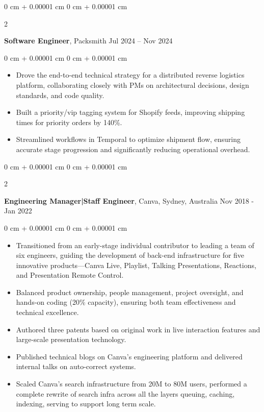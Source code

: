 \documentclass[10pt, letterpaper]{article}
\newenvironment{highlights}{
    \begin{itemize}[
        topsep=0.10 cm,
        parsep=0.10 cm,
        partopsep=0pt,
        itemsep=0pt,
        leftmargin=0 cm + 10pt
    ]
}{
    \end{itemize}
} %
\newenvironment{onecolentry}{
    \begin{adjustwidth}{
        0 cm + 0.00001 cm
    }{
        0 cm + 0.00001 cm
    }
}{
    \end{adjustwidth}
} %
\newenvironment{twocolentry}[2][]{
    \onecolentry
    \def\secondColumn{#2}
    \setcolumnwidth{\fill, 4.5 cm}
    \begin{paracol}{2}
}{
    \switchcolumn \raggedleft \secondColumn
    \end{paracol}
    \endonecolentry
} %
\begin{document}
        \vspace{0.15 cm}
        \begin{twocolentry}{
            Jul 2024 – Nov 2024
        }
            \textbf{Software Engineer}, Packsmith\end{twocolentry}

        \vspace{0.10 cm}
        \begin{onecolentry}
            \begin{highlights}
                \item Drove the end-to-end technical strategy for a distributed reverse logistics platform, collaborating closely with PMs on architectural decisions, design standards, and code quality.
                \item Built a priority/vip tagging system for Shopify feeds, improving shipping times for priority orders by 140\%.
                \item Streamlined workflows in Temporal to optimize shipment flow, ensuring accurate stage progression and significantly reducing operational overhead.
            \end{highlights}
        \end{onecolentry}
        
        \vspace{0.15 cm}

        \begin{twocolentry}{
            Nov 2018 - Jan 2022
        }
            \textbf{Engineering Manager|Staff Engineer}, Canva, Sydney, Australia\end{twocolentry}

        \vspace{0.10 cm}
        \begin{onecolentry}
            \begin{highlights}
                \item Transitioned from an early-stage individual contributor to leading a team of six engineers, guiding the development of back-end infrastructure for five innovative products—Canva Live, Playlist, Talking Presentations, Reactions, and Presentation Remote Control.
                \item Balanced product ownership, people management, project oversight, and hands-on coding (20\% capacity), ensuring both team effectiveness and technical excellence.
                \item Authored three patents based on original work in live interaction features and large-scale presentation technology.
                \item Published technical blogs on Canva's engineering platform and delivered internal talks on auto-correct systems.
                \item Scaled Canva's search infrastructure from 20M to 80M users, performed a complete rewrite of search infra across all the layers queuing, caching, indexing, serving to support long term scale.
            \end{highlights}
        \end{onecolentry}
\end{document}
